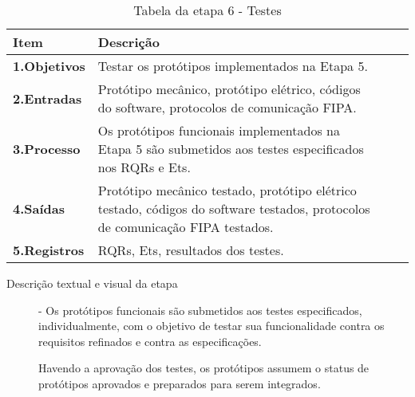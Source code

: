 \begin{table}[htbp]
	\centering
	\caption{Tabela da etapa 6 - Testes}
	\begin{tabular}{|l| p{13.5cm}| c| c| } \hline
		\textbf{Item} 	    & \textbf{Descrição} 
		\\ \hline
		\textbf{1.Objetivos}	   &  
		Testar os protótipos implementados na Etapa 5.
		\\ \hline
		\textbf{2.Entradas}	  &		
		Protótipo mecânico, protótipo elétrico, códigos do software, protocolos de comunicação FIPA. 
		\\ \hline	
		\textbf{3.Processo}     &
		Os protótipos funcionais implementados na Etapa 5 são submetidos aos testes especificados nos RQRs e Ets.
		\\ \hline
		\textbf{4.Saídas}		& 
		Protótipo mecânico testado, protótipo elétrico testado, códigos do software testados, protocolos de comunicação FIPA testados.  	
		\\ \hline
		\textbf{5.Registros}   & 	
		RQRs, Ets, resultados dos testes.
		\\ \hline
	\end{tabular}	
	\label{T8}\par
\end{table}

\begin{description}
	
\item[Descrição textual e visual da etapa] - Os protótipos funcionais são submetidos aos testes especificados, individualmente, com o objetivo de testar sua funcionalidade contra os requisitos refinados e contra as especificações.\par 
Havendo a aprovação dos testes, os protótipos assumem o status de protótipos aprovados e preparados para serem integrados.

\end{description}

